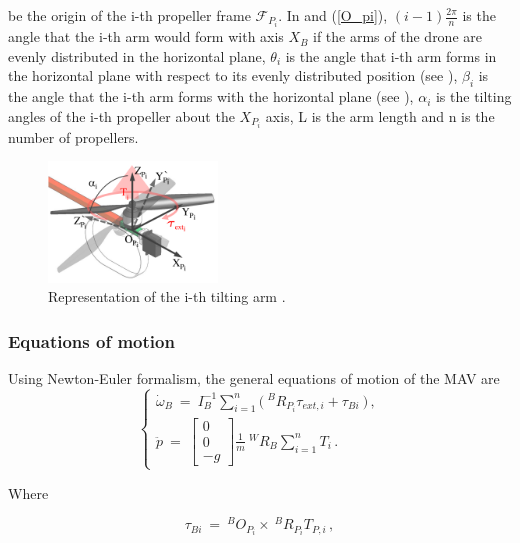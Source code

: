 be the origin of the i-th propeller frame  $\mathcal{F}_{P_{i}}$.
In  and (\ref{O_pi}), $(i-1)\frac{2\pi}{n}$ is the angle that
the i-th arm would form with axis $X_B$ if the arms of the drone are evenly
distributed in the horizontal plane, $\theta_i$ is the angle that i-th arm forms
in the horizontal plane with respect to its evenly distributed position
(see ), $\beta_i$ is the angle that the i-th arm forms with
the horizontal plane (see ), $\alpha_{i}$ is the tilting
angles of the i-th propeller about the $X_{P_{i}}$ axis, L is the arm length and
n is the number of propellers.

\begin{figure}[h]
  \centering
  \includegraphics[width=0.4\textwidth]{images/tilt_model.png}
  \caption{Representation of the i-th tilting arm \citep{ryll_modeling_2012}.}
  \label{fig:tilt_model}
\end{figure}

\subsubsection{Equations of motion}
\label{sec:equations}
Using Newton-Euler formalism, the general equations of motion of the MAV are
\begin{equation}
  \label{acc_eq}
  \begin{cases}
    \dot{\omega}_B  \ = \ I_B^{-1} \sum_{i=1}^{n}  \big(\ ^{B}R_{P_{i}} \tau_{ext,i} + \tau_{Bi} \ \big) \, ,\\
    \ddot{p}  \ = \
    \begin{bmatrix}
      0 \\
      0 \\
      -g
    \end{bmatrix}
    \frac{1}{m} \ ^{W}R_B \sum_{i=1}^{n} T_i \, .
  \end{cases}
\end{equation}

Where

\begin{equation}
  \label{tau_b_i}
  \tau_{Bi}  \ = \ ^{B}O_{P_{i}} \times\   ^{B}R_{P_{i}} T_{P,i}\, ,
\end{equation}

